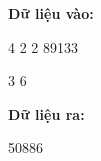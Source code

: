 \textbf{     Dữ liệu vào:    }

    4 2 2 89133   

    3 6   

\textbf{     Dữ liệu ra:    }

    50886